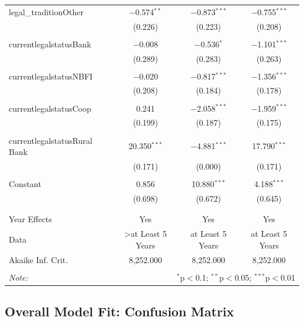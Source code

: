 \documentclass[a4paper, nobind]{templates/ociamthesis}
\begin{document}
\begin{table}[!htbp]
\begin{tabular}{@{\extracolsep{5pt}}lccc}
 legal\_traditionOther & $-$0.574$^{**}$ & $-$0.873$^{***}$ & $-$0.755$^{***}$ \\ 
  & (0.226) & (0.223) & (0.208) \\ 
  & & & \\ 
 currentlegalstatusBank & $-$0.008 & $-$0.536$^{*}$ & $-$1.101$^{***}$ \\ 
  & (0.289) & (0.283) & (0.263) \\ 
  & & & \\ 
 currentlegalstatusNBFI & $-$0.020 & $-$0.817$^{***}$ & $-$1.356$^{***}$ \\ 
  & (0.208) & (0.184) & (0.178) \\ 
  & & & \\ 
 currentlegalstatusCoop & 0.241 & $-$2.058$^{***}$ & $-$1.959$^{***}$ \\ 
  & (0.199) & (0.187) & (0.175) \\ 
  & & & \\ 
 currentlegalstatusRural Bank & 20.350$^{***}$ & $-$4.881$^{***}$ & 17.790$^{***}$ \\ 
  & (0.171) & (0.000) & (0.171) \\ 
  & & & \\ 
 Constant & 0.856 & 10.880$^{***}$ & 4.188$^{***}$ \\ 
  & (0.698) & (0.672) & (0.645) \\ 
  & & & \\ 
\hline \\[-1.8ex] 
Year Effects & Yes & Yes & Yes \\ 
Data & >at Least 5 Years & at Least 5 Years & at Least 5 Years \\ 
Akaike Inf. Crit. & 8,252.000 & 8,252.000 & 8,252.000 \\ 
\hline 
\hline \\[-1.8ex] 
\textit{Note:}  & \multicolumn{3}{r}{$^{*}$p$<$0.1; $^{**}$p$<$0.05; $^{***}$p$<$0.01} \\ 
\end{tabular} 
\end{table}

\newpage

\hypertarget{overall-model-fit-confusion-matrix}{%
\subsection{Overall Model Fit: Confusion Matrix}\label{overall-model-fit-confusion-matrix}}
\end{document}
